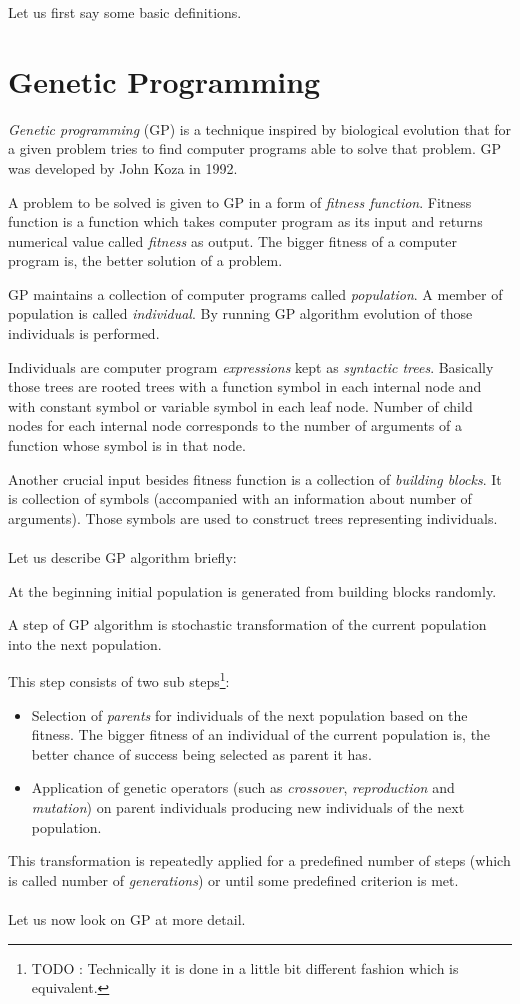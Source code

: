 \documentclass[12pt,a4paper]{report}
\newcommand{\Lets}{Let us\xspace}
\begin{document}
	\Lets first say some basic definitions.

\section{Genetic Programming}

\textit{Genetic programming} (GP) is a technique inspired by biological evolution
that for a given problem tries to find computer programs able to solve that problem. 
GP was developed by John Koza \cite{koza92} in 1992.

A problem to be solved is given to GP in a form of \textit{fitness function}. 
Fitness function is a function which takes computer program as its input and 
returns numerical value called \textit{fitness} as output. 
The bigger fitness of a computer program is, the better solution of a problem.

GP maintains a collection of computer programs called \textit{population}. 
A member of population is called \textit{individual}. 
By running GP algorithm evolution of those individuals is performed.

Individuals are computer program \textit{expressions} kept as \textit{syntactic trees}. 
Basically those trees are rooted trees with a function symbol in each internal node 
and with constant symbol or variable symbol in each leaf node. 
Number of child nodes for each internal node corresponds to the number of arguments of a function whose symbol is in that node.

Another crucial input besides fitness function is a collection of \textit{building blocks}.
It is collection of symbols (accompanied with an information about number of arguments).
Those symbols are used to construct trees representing individuals.  
\\\\
\Lets describe GP algorithm briefly:

At the beginning initial population is generated from building blocks randomly.

A step of GP algorithm is stochastic transformation of the current population into 	
the next population.

This step consists of two sub steps\footnote{TODO : Technically it is done in a little  
bit different fashion which is equivalent.}:
\begin{itemize} 
	\item Selection of \textit{parents} for individuals of the next population based on the fitness.
	      The bigger fitness of an individual of the current population is, 
	      the better chance of success being selected as parent it has.  
	\item Application of genetic operators (such as \textit{crossover}, 
	      \textit{reproduction} and \textit{mutation}) 
		  on parent individuals producing new individuals of the next population.  
\end{itemize}	  
This transformation is repeatedly applied for a predefined number of steps (which is called 
number of \textit{generations}) or until some predefined criterion is met.	
\\\\
\Lets now look on GP at more detail. 
\end{document}
